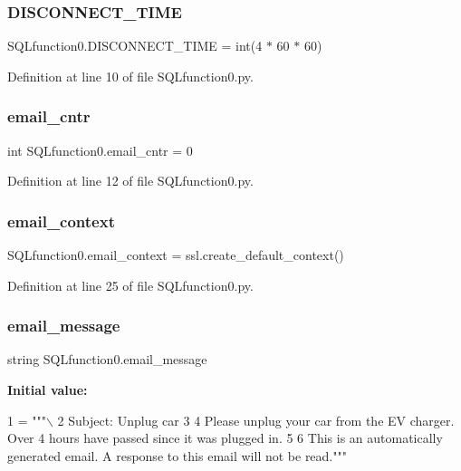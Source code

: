 \subsubsection{D\+I\+S\+C\+O\+N\+N\+E\+C\+T\+\_\+\+T\+I\+ME}
{\footnotesize\ttfamily S\+Q\+Lfunction0.\+D\+I\+S\+C\+O\+N\+N\+E\+C\+T\+\_\+\+T\+I\+ME = int(4 $\ast$ 60 $\ast$ 60)}



Definition at line 10 of file S\+Q\+Lfunction0.\+py.

\mbox{\label{namespace_s_q_lfunction0_a6758517dd4942832561ab80a5d3b2e8a}} 
\subsubsection{email\+\_\+cntr}
{\footnotesize\ttfamily int S\+Q\+Lfunction0.\+email\+\_\+cntr = 0}



Definition at line 12 of file S\+Q\+Lfunction0.\+py.

\mbox{\label{namespace_s_q_lfunction0_a41e0256ae441a632af4c9a9dc14d33eb}} 
\subsubsection{email\+\_\+context}
{\footnotesize\ttfamily S\+Q\+Lfunction0.\+email\+\_\+context = ssl.\+create\+\_\+default\+\_\+context()}



Definition at line 25 of file S\+Q\+Lfunction0.\+py.

\mbox{\label{namespace_s_q_lfunction0_aaf1a5b185d0c43f93d0640465c0ade22}} 
\subsubsection{email\+\_\+message}
{\footnotesize\ttfamily string S\+Q\+Lfunction0.\+email\+\_\+message}

{\bfseries Initial value\+:}
\begin{DoxyCode}
1 =  \textcolor{stringliteral}{"""\(\backslash\)}
2 \textcolor{stringliteral}{Subject: Unplug car}
3 \textcolor{stringliteral}{}
4 \textcolor{stringliteral}{Please unplug your car from the EV charger. Over 4 hours have passed since it was plugged in.}
5 \textcolor{stringliteral}{}
6 \textcolor{stringliteral}{This is an automatically generated email. A response to this email will not be read."""}
\end{DoxyCode}


